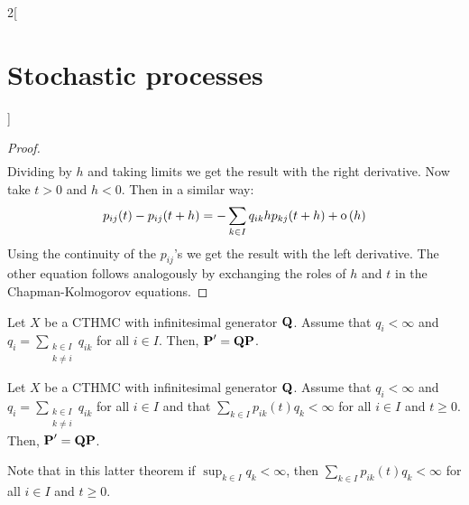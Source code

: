 \documentclass[../../../main_math.tex]{subfiles}
\begin{document}
\begin{multicols}{2}[\section{Stochastic processes}]
\begin{proof}
\begin{multline*}
    \end{multline*}
    Dividing by $h$ and taking limits we get the result with the right derivative. Now take $t>0$ and $h<0$. Then in a similar way:
    $$
      p_{ij}(t)-p_{ij}(t+h)=-\sum_{k\in I}q_{ik}h p_{kj}(t+h)+\mathrm{o}\left(h\right)
    $$
    Using the continuity of the $p_{ij}$'s we get the result with the left derivative. The other equation follows analogously by exchanging the roles of $h$ and $t$ in the Chapman-Kolmogorov equations.
  \end{proof}
  \begin{theorem}
    Let $X$ be a CTHMC with infinitesimal generator $\boldsymbol{\mathrm{Q}}$. Assume that $q_i<\infty$ and $q_i=\sum_{\substack{k\in I\\k\ne i}}q_{ik}$ for all $i\in I$. Then, $\boldsymbol{\mathrm{P}}'=\boldsymbol{\mathrm{Q}}\boldsymbol{\mathrm{P}}$.
  \end{theorem}
  \begin{theorem}
    Let $X$ be a CTHMC with infinitesimal generator $\boldsymbol{\mathrm{Q}}$. Assume that $q_i<\infty$ and $q_i=\sum_{\substack{k\in I\\k\ne i}}q_{ik}$ for all $i\in I$ and that $\sum_{k\in I}p_{ik}(t)q_k<\infty$ for all $i\in I$ and $t\geq 0$. Then, $\boldsymbol{\mathrm{P}}'=\boldsymbol{\mathrm{Q}}\boldsymbol{\mathrm{P}}$.
  \end{theorem}
  \begin{remark}
    Note that in this latter theorem if $\sup_{k\in I}q_k<\infty$, then $\sum_{k\in I}p_{ik}(t)q_k<\infty$ for all $i\in I$ and $t\geq 0$.
  \end{remark}

\end{multicols}
\end{document}

